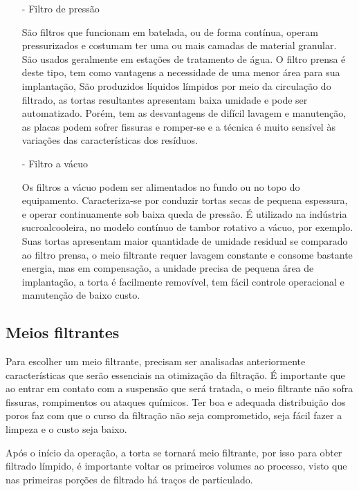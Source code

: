 \begin{enumerate}

\item[-] Filtro de pressão
 
  São filtros que funcionam em batelada, ou de forma contínua, operam
  pressurizados e costumam ter uma ou mais camadas de material granular. São
  usados geralmente em estações de tratamento de água. O filtro prensa é deste
  tipo, tem como vantagens a necessidade de uma menor área para sua implantação,
  São produzidos líquidos límpidos por meio da circulação do filtrado, as tortas
  resultantes apresentam baixa umidade e pode ser automatizado. Porém, tem as
  desvantagens de difícil lavagem e manutenção, as placas podem sofrer fissuras
  e romper-se e a técnica é muito sensível às variações das características dos
  resíduos.


\item[-] Filtro a vácuo

  Os filtros a vácuo podem ser alimentados no fundo ou no topo do equipamento.
  Caracteriza-se por conduzir tortas secas de pequena espessura, e operar
  continuamente sob baixa queda de pressão. É utilizado na indústria
  sucroalcooleira, no modelo contínuo de tambor rotativo a vácuo, por exemplo.
  Suas tortas apresentam maior quantidade de umidade residual se comparado ao
  filtro prensa, o meio filtrante requer lavagem constante e consome bastante
  energia, mas em compensação, a unidade precisa de pequena área de implantação,
  a torta é facilmente removível, tem fácil controle operacional e manutenção de
  baixo custo.


\end{enumerate}


\subsection{Meios filtrantes}
\label{subsec:meiosfiltrantes}

Para escolher um meio filtrante, precisam ser analisadas anteriormente
características que serão essenciais na otimização da filtração. É importante
que ao entrar em contato com a suspensão que será tratada, o meio filtrante não
sofra fissuras, rompimentos ou ataques químicos. Ter boa e adequada distribuição
dos poros faz com que o curso da filtração não seja comprometido, seja fácil
fazer a limpeza e o custo seja baixo.

Após o início da operação, a torta se tornará meio filtrante, por isso para
obter filtrado límpido, é importante voltar os primeiros volumes ao processo,
visto que nas primeiras porções de filtrado há traços de particulado.

